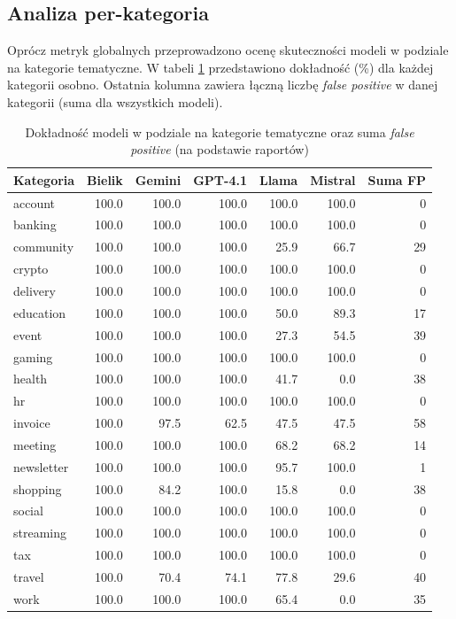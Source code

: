 \documentclass[12pt,a4paper,openany]{report}
\begin{document}
\subsection{Analiza per-kategoria}

Oprócz metryk globalnych przeprowadzono ocenę skuteczności modeli w podziale na kategorie tematyczne. W tabeli \ref{tab:per-category-accuracy} przedstawiono dokładność (\%) dla każdej kategorii osobno. Ostatnia kolumna zawiera łączną liczbę \textit{false positive} w danej kategorii (suma dla wszystkich modeli).

\begin{table}[H]
    \centering
    \scriptsize
    \begin{tabular}{l r r r r r r}
        \toprule
        Kategoria & Bielik & Gemini & GPT-4.1 & Llama & Mistral & Suma FP \\
        \midrule
        account & 100.0 & 100.0 & 100.0 & 100.0 & 100.0 & 0 \\
        banking & 100.0 & 100.0 & 100.0 & 100.0 & 100.0 & 0 \\
        community & 100.0 & 100.0 & 100.0 & 25.9 & 66.7 & 29 \\
        crypto & 100.0 & 100.0 & 100.0 & 100.0 & 100.0 & 0 \\
        delivery & 100.0 & 100.0 & 100.0 & 100.0 & 100.0 & 0 \\
        education & 100.0 & 100.0 & 100.0 & 50.0 & 89.3 & 17 \\
        event & 100.0 & 100.0 & 100.0 & 27.3 & 54.5 & 39 \\
        gaming & 100.0 & 100.0 & 100.0 & 100.0 & 100.0 & 0 \\
        health & 100.0 & 100.0 & 100.0 & 41.7 & 0.0 & 38 \\
        hr & 100.0 & 100.0 & 100.0 & 100.0 & 100.0 & 0 \\
        invoice & 100.0 & 97.5 & 62.5 & 47.5 & 47.5 & 58 \\
        meeting & 100.0 & 100.0 & 100.0 & 68.2 & 68.2 & 14 \\
        newsletter & 100.0 & 100.0 & 100.0 & 95.7 & 100.0 & 1 \\
        shopping & 100.0 & 84.2 & 100.0 & 15.8 & 0.0 & 38 \\
        social & 100.0 & 100.0 & 100.0 & 100.0 & 100.0 & 0 \\
        streaming & 100.0 & 100.0 & 100.0 & 100.0 & 100.0 & 0 \\
        tax & 100.0 & 100.0 & 100.0 & 100.0 & 100.0 & 0 \\
        travel & 100.0 & 70.4 & 74.1 & 77.8 & 29.6 & 40 \\
        work & 100.0 & 100.0 & 100.0 & 65.4 & 0.0 & 35 \\
        \bottomrule
    \end{tabular}
    \caption{Dokładność modeli w podziale na kategorie tematyczne oraz suma \textit{false positive} (na podstawie raportów)}
    \label{tab:per-category-accuracy}
\end{table}
\end{document}

